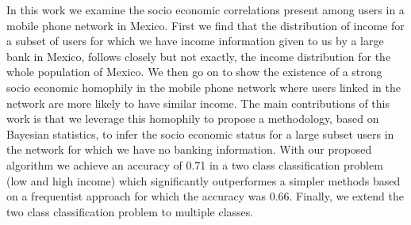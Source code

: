 

In this work we examine the socio economic correlations present among users in a mobile phone network in Mexico. First we find that the distribution of income for a subset of users for which we have income information given to us by a large bank in Mexico, follows closely but not exactly, the income distribution for the whole population of Mexico. We then go on to show the existence of a strong socio economic homophily in the mobile phone network where users linked in the network are more likely to have similar income. The main contributions of this work is that we leverage this homophily to propose a methodology, based on Bayesian statistics, to infer the socio economic status for a large subset users in the network for which we have no banking information. With our proposed algorithm we achieve an accuracy of 0.71 in a two class classification problem (low and high income) which significantly outperformes a simpler methods based on a frequentist approach for which the accuracy was 0.66. Finally, we extend the two class classification problem to multiple classes. 

